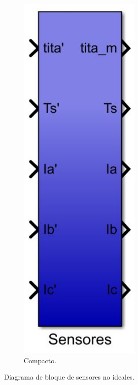 \documentclass{article}
\begin{document}
\begin{figure}[H]
\begin{subfigure}[b]{0.24\textwidth}
        \includegraphics[width=0.65\textwidth]{sensores_ideales_compacto.jpg}
        \caption{Compacto.}
    \end{subfigure}
    \caption{Diagrama de bloque de sensores no ideales.}
\end{figure}
\end{document}
